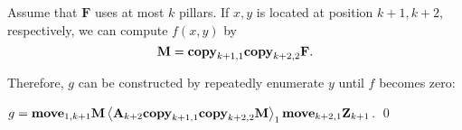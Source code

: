 \begin{pf} \rm
 Assume that $\mathbf{F}$ uses at most $k$ pillars.
 If $x, y$ is located at position $k + 1, k + 2$, respectively,
 we can compute $f(x, y)$ by
\[
 \mathbf{M} = \mathbf{copy}_{k+1, 1} \mathbf{copy}_{k + 2, 2} \mathbf{F}.
\]

Therefore, $g$ can be constructed by repeatedly enumerate $y$ until $f$ becomes zero:

$g = \mathbf{move}_{1, k + 1} \mathbf{M} \left\langle \mathbf{A}_{k+2} \mathbf{copy}_{k+1, 1}\mathbf{copy}_{k+2, 2} \mathbf{M} \right\rangle_1
\mathbf{move}_{k + 2, 1} \mathbf{Z}_{k+1}
$.
 \qed
\end{pf}
